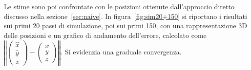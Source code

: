 \documentclass[12pt,a4paper,openright,twoside]{book}
\begin{document}
Le stime sono poi confrontate con le posizioni ottenute dall'approccio diretto discusso nella sezione~\ref{sec:naive}. In figura~\ref{fig:sim20+150} si riportano i risultati sui primi 20 passi di simulazione, poi sui primi 150, con una rappresentazione 3D delle posizioni e un grafico di andamento dell'errore, calcolato come $\left\Vert\left(\begin{smallmatrix}\hat{x}\\\hat{y}\\\hat{z}\end{smallmatrix}\right)-\left(\begin{smallmatrix}x\\y\\z\end{smallmatrix}\right)\right\Vert$. Si evidenzia una graduale convergenza.
\end{document}
